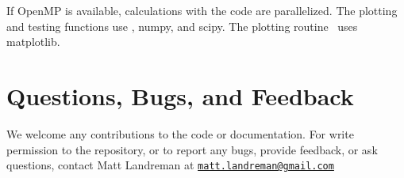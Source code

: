 If OpenMP is available, calculations with the code are parallelized.  The plotting and testing functions use \python,
{\ttfamily numpy}, and {\ttfamily scipy}.
The plotting routine \bdistribPlot~uses {\ttfamily matplotlib}.

\section{Questions, Bugs, and Feedback}

We welcome any contributions to the code or documentation.
For write permission to the repository, or to report any bugs, provide feedback, or ask questions, contact Matt Landreman at
\href{mailto:matt.landreman@gmail.com}{\nolinkurl{matt.landreman@gmail.com} }







